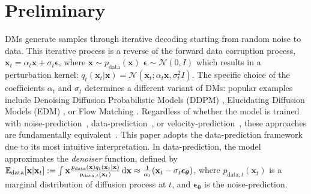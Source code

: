 \section{Preliminary}
\label{preliminary}



%
%
DMs generate samples through iterative 
decoding starting from random noise to data. This iterative process is a reverse of the forward 
data corruption 
process, 
$\mathbf{x}_{t}=\alpha_{t}\mathbf{x}+\sigma_{t}\bm{\epsilon}$, where $\mathbf{x} \sim p_{\text{data}}(\mathbf{x})$ 
$\bm{\epsilon} \sim \mathcal{N}(0,I)$ 
which results in a perturbation kernel: $q_{t}(\mathbf{x}_{t}\vert\mathbf{x})=\mathcal{N}(\mathbf{x}_{t};\alpha_{t}\mathbf{x},\sigma_{t}^{2}I)$. The specific choice of the coefficients $\alpha_{t}$ and $\sigma_{t}$ determines a different variant of DMs: 
popular examples include 
Denoising Diffusion Probabilistic Models (DDPM) \cite{ho2020denoising}, Elucidating Diffusion Models (EDM) \cite{karras2022elucidating}, or Flow Matching \cite{lipman2022flow}. 
%
Regardless of whether the model is trained with noise-prediction~\cite{ho2020denoising}, data-prediction~\cite{karras2022elucidating}, or velocity-prediction~\cite{salimans2022progressive,lipman2022flow}, these approaches are fundamentally equivalent~\cite{kingma2021variational,kim2021soft}. This paper adopts the data-prediction framework due to its most intuitive interpretation. In data-prediction, the model approximates the \textit{denoiser} function, defined by
$\mathbb{E}_{\text{data}}[\mathbf{x}\vert\mathbf{x}_{t}]:=\int \mathbf{x} \frac{p_{\text{data}}(\mathbf{x})q_{t}(\mathbf{x}_{t}\vert\mathbf{x})}{p_{\text{data},t}(\mathbf{x}_{t})}\mathop{}\!\mathrm{d}\mathbf{x}\approx\frac{1}{\alpha_{t}}(\mathbf{x}_{t}-\sigma_{t}\bm{\epsilon}_{\bm{\theta}})$,
where $p_{\text{data},t}(\mathbf{x}_{t})$ is a marginal distribution of diffusion process at $t$, and $\bm{\epsilon}_{\bm{\theta}}$ is the noise-prediction.

